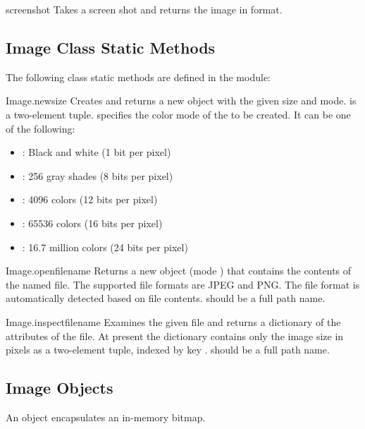 \begin{funcdesc}{screenshot}{}
Takes a screen shot and returns the image in  format.
\end{funcdesc}

\subsection{Image Class Static Methods}
\label{subsec:image}
The following  class static methods are defined in the 
 module:

\begin{funcdesc}{Image.new}{size}
Creates and returns a new  object with the given size and 
mode.  is a two-element tuple.  specifies the 
color mode of the  to be created. It can be one of the 
following:

\begin{itemize}
\item {}: Black and white (1 bit per pixel)
\item {}: 256 gray shades (8 bits per pixel)
\item {}: 4096 colors (12 bits per pixel)
\item {}: 65536 colors (16 bits per pixel)
\item {}: 16.7 million colors (24 bits per pixel)
\end{itemize}
\end{funcdesc}

\begin{funcdesc}{Image.open}{filename}
\notinfirsted
Returns a new  object (mode ) that contains the 
contents of the named file. The supported file formats are JPEG and PNG. The 
file format is automatically detected based on file contents. 
 should be a full path name.
\end{funcdesc}

\begin{funcdesc}{Image.inspect}{filename}
\notinfirsted
Examines the given file and returns a dictionary of the attributes of the 
file. At present the dictionary contains only the image size in pixels as a 
two-element tuple, indexed by key . 
 should be a full path name.
\end{funcdesc}

\subsection{Image Objects}
\label{subsec:image-objects}
An  object encapsulates an in-memory bitmap. 

